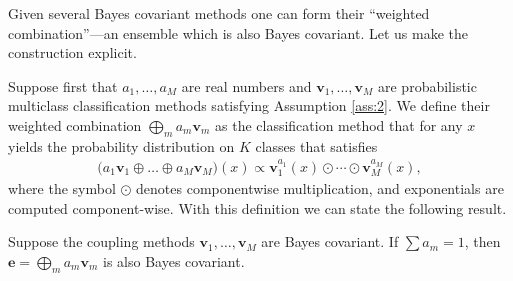 Given several Bayes covariant methods one can form  their ``weighted combination''---an ensemble which is also Bayes covariant. Let us make the construction explicit.

Suppose first that $a_1, \ldots,a_M$ are real numbers and $\boldsymbol{v}_1, \ldots, \boldsymbol{v}_M$ are probabilistic multiclass classification methods satisfying Assumption \ref{ass:2}. We define their weighted combination $\bigoplus_m a_m \boldsymbol{v}_m$ as the classification method that for any $x$ yields the probability distribution on $K$ classes that satisfies
\begin{align*}
 	\bigl(a_1 \boldsymbol{v}_1 \oplus \ldots \oplus a_M \boldsymbol{v}_M\bigr)(x) \propto \boldsymbol{v}_1^{a_1}(x) \odot \cdots \odot \boldsymbol{v}_M^{a_M}(x),
\end{align*}
where the symbol $\odot$ denotes componentwise multiplication, and exponentials are computed component-wise. With this definition we can state the following result.

\begin{prop}
	\label{prop:ensemble}
Suppose the coupling methods $\boldsymbol{v}_1, \ldots, \boldsymbol{v}_M$ are Bayes covariant. If $\sum a_m = 1$, then $\boldsymbol{e} = \bigoplus_m a_m \boldsymbol{v}_m$ is also Bayes covariant.
\end{prop}

